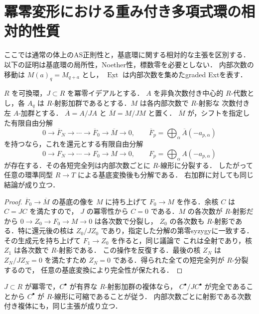\section{冪零変形における重み付き多項式環の相対的性質}
\label{subsec:nilpotent-weighted-as}

ここでは通常の体上のAS正則性と，基底環に関する相対的な主張を区別する．
以下の証明は基底環の局所性，Noether性，標数零を必要としない．
内部次数の移動は $M(a)_q=M_{q+a}$ とし，
$\underline{\operatorname{Ext}}$ は内部次数を集めたgraded Extを表す．

\begin{lemma}[有限自由分解の冪零持上げ]
\label{lem:nilpotent-resolution-lift}
$R$ を可換環，$J\subset R$ を冪零イデアルとする．
$A$ を非負次数付き中心的 $R$-代数とし，各 $A_q$ は
$R$-射影加群であるとする．$M$ は各内部次数で $R$-射影な
次数付き左 $A$-加群とする．
$\overline A=A/JA$ と $\overline M=M/JM$ と置く．
$\overline M$ が，シフトを指定した有限自由分解
\[
 0\longrightarrow\overline F_N\longrightarrow\cdots
 \longrightarrow\overline F_0\longrightarrow\overline M
 \longrightarrow0,\qquad
 \overline F_p=\bigoplus_\alpha\overline A(-a_{p,\alpha})
\]
を持つなら，これを還元とする有限自由分解
\[
 0\longrightarrow F_N\longrightarrow\cdots
 \longrightarrow F_0\longrightarrow M\longrightarrow0,
 \qquad F_p=\bigoplus_\alpha A(-a_{p,\alpha})
\]
が存在する．その各短完全列は内部次数ごとに $R$-線形に分裂する．
したがって任意の環準同型 $R\to T$ による基底変換後も分解である．
右加群に対しても同じ結論が成り立つ．
\end{lemma}

\begin{proof}
$\overline F_0\to\overline M$ の基底の像を $M$ に持ち上げて
$F_0\to M$ を作る．余核 $C$ は $C=JC$ を満たすので，
$J$ の冪零性から $C=0$ である．$M$ の各次数が $R$-射影だから
$0\to Z_0\to F_0\to M\to0$ は各次数で分裂し，
$Z_0$ の各次数も $R$-射影である．特に還元後の核は
$Z_0/JZ_0$ であり，指定した分解の第零syzygyに一致する．
その生成元を持ち上げて $F_1\to Z_0$ を作ると，同じ議論で
これは全射であり，核 $Z_1$ は各次数で $R$-射影である．
この操作を反復する．最後の核 $Z_N$ は $Z_N/JZ_N=0$ を満たすため
$Z_N=0$ である．得られた全ての短完全列が $R$-分裂するので，
任意の基底変換により完全性が保たれる．
\end{proof}

\begin{lemma}[有界射影複体の完全性の検出]
\label{lem:nilpotent-complex-exactness}
$J\subset R$ が冪零で，$C^\bullet$ が有界な $R$-射影加群の複体なら，
$C^\bullet/JC^\bullet$ が完全であることから
$C^\bullet$ が $R$-線形に可縮であることが従う．
内部次数ごとに射影である次数付き複体にも，同じ主張が成り立つ．
\end{lemma}

